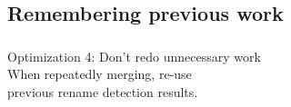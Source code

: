 \documentclass[compress,t]{beamer}
\begin{document}
\subsection[Remembering]{Remembering previous work}
\begin{frame}
  \frametitle{}

  \vfill
  {\Large
  \begin{center}
    Optimization 4: Don't redo unnecessary work\\
    \vspace*{\baselineskip}
    \pause
    When repeatedly merging, re-use\\ previous rename detection results.
  \end{center}
  }
  \vfill
\end{frame}

\end{document}
